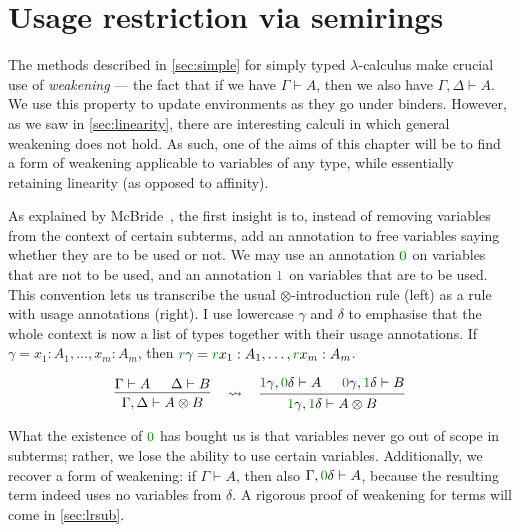 \chapter{Usage restriction via semirings}\label{sec:semirings}

The methods described in \cref{sec:simple} for simply typed $\lambda$-calculus
make crucial use of \emph{weakening} --- the fact that if we have
$\Gamma \vdash A$, then we also have $\Gamma, \Delta \vdash A$.
We use this property to update environments as they go under binders.
However, as we saw in \cref{sec:linearity}, there are interesting calculi in
which general weakening does not hold.
As such, one of the aims of this chapter will be to find a form of weakening
applicable to variables of any type, while essentially retaining linearity
(as opposed to affinity).

As explained by McBride~\cite{McBride16}, the first insight is to, instead of
removing variables from the context of certain subterms, add an annotation to
free variables saying whether they are to be used or not.
We may use an annotation $\gr0$ on variables that are not to be used, and an
annotation $\gr1$ on variables that are to be used.
This convention lets us transcribe the usual $\otimes$-introduction rule
(left) as a rule with usage annotations (right).
I use lowercase $\gamma$ and $\delta$ to emphasise that the whole context is
now a list of types together with their usage annotations.
If $\gamma = x_1 : A_1, \ldots, x_m : A_m$, then
$\gr r\gamma = \gr rx_1 : A_1, \ldots, \gr rx_m : A_m$.

\[
  \begin{prooftree}
    \hypo{\Gamma \vdash A}
    \hypo{\Delta \vdash B}
    \infer2{\Gamma, \Delta \vdash A \otimes B}
  \end{prooftree}
  \quad\rightsquigarrow\quad
  \begin{prooftree}
    \hypo{\gr1\gamma, \gr0\delta \vdash A}
    \hypo{\gr0\gamma, \gr1\delta \vdash B}
    \infer2{\gr1\gamma, \gr1\delta \vdash A \otimes B}
  \end{prooftree}
\]

What the existence of $\gr0$ has bought us is that variables never go out of
scope in subterms; rather, we lose the ability to use certain variables.
Additionally, we recover a form of weakening: if $\Gamma \vdash A$, then also
$\Gamma, \gr0\delta \vdash A$, because the resulting term indeed uses no
variables from $\delta$.
A rigorous proof of weakening for terms will come in \cref{sec:lrsub}.

